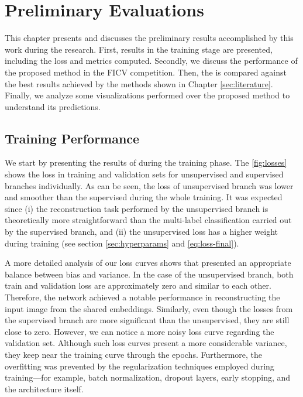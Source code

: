 \section{Preliminary Evaluations} \label{sec:results}

This chapter presents and discusses the preliminary results accomplished by this work during the research. First, \methodname results in the training stage are presented, including the loss and metrics computed. Secondly, we discuss the performance of the proposed method in the FICV competition. Then, the \methodname is compared against the best results achieved by the methods shown in Chapter \ref{sec:literature}. Finally, we analyze some visualizations performed over the proposed method to understand its predictions.

\subsection{Training Performance}

We start by presenting the results of \methodname during the training phase. The \autoref{fig:losses} shows the loss in training and validation sets for unsupervised and supervised branches individually. As can be seen, the loss of unsupervised branch was lower and smoother than the supervised during the whole training. It was expected since (i) the reconstruction task performed by the unsupervised branch is theoretically more straightforward than the multi-label classification carried out by the supervised branch, and (ii) the unsupervised loss has a higher weight during training (see section \ref{sec:hyperparams} and \autoref{eq:loss-final}). 

A more detailed analysis of our loss curves shows that \methodname presented an appropriate balance between bias and variance. In the case of the unsupervised branch, both train and validation loss are approximately zero and similar to each other. Therefore, the network achieved a notable performance in reconstructing the input image from the shared embeddings. Similarly, even though the losses from the supervised branch are more significant than the unsupervised, they are still close to zero. However, we can notice a more noisy loss curve regarding the validation set. Although such loss curves present a more considerable variance, they keep near the training curve through the epochs. Furthermore, the overfitting was prevented by the regularization techniques employed during training—for example, batch normalization, dropout layers, early stopping, and the architecture itself.

